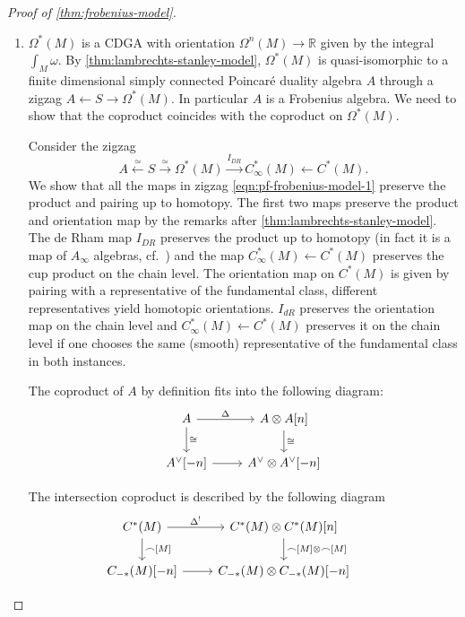 \documentclass{scrartcl}
\theoremstyle{plain}
\theoremstyle{definition}
\newcommand{\R}{\mathbb R}
\newcommand{\capp}{\mathbin{\frown}}
\newcommand{\iso}{\cong}
\newcommand{\quiso}{\simeq}
\newcommand{\from}{\leftarrow}
\let\xto\xrightarrow
\let\xfrom\xleftarrow
\begin{document}
\begin{proof}[Proof of \cref{thm:frobenius-model}]
    \begin{enumerate}
        \item 
    $\Omega^*(M)$ is a CDGA with orientation $\Omega^n(M)\to \R$ given by the integral $\int_M\omega$. By \cref{thm:lambrechts-stanley-model}, $\Omega^*(M)$ is quasi-isomorphic to a finite dimensional simply connected Poincaré duality algebra $A$ through a zigzag $A\from S\to \Omega^*(M)$. In particular $A$ is a Frobenius algebra. We need to show that the coproduct coincides with the coproduct on $\Omega^*(M)$. 


    Consider the zigzag 
    \begin{equation}A\xfrom{\quiso} S \xto{\quiso} \Omega^*(M)\xto{I_{DR}} C^*_\infty(M) \from C^*(M).\label{eqn:pf-frobenius-model-1}\end{equation} 
    We show that all the maps in zigzag \ref{eqn:pf-frobenius-model-1} preserve the product and pairing up to homotopy. The first two maps preserve the product and orientation map by the remarks after \cref{thm:lambrechts-stanley-model}. The de Rham map $I_{DR}$ preserves the product up to homotopy (in fact it is a map of $A_\infty$ algebras, cf.\ \cite{gugenheim1977chen}) and the map $C^*_\infty(M) \from C^*(M)$ preserves the cup product on the chain level. The orientation map on $C^*(M)$ is given by pairing with a representative of the fundamental class, different representatives yield homotopic orientations. $I_{dR}$ preserves the orientation map on the chain level and $C^*_\infty(M) \from C^*(M)$ preserves it on the chain level if one chooses the same (smooth) representative of the fundamental class in both instances. 

    The coproduct of $A$ by definition fits into the following diagram:
    \begin{equation}\label{diag:pf-frobenius-model-1}
        \begin{tikzcd}
            A \dar["\iso"]\rar["\Delta"] & A\otimes A[n] \dar["\iso"] \\
            A^\vee[-n] \rar & A^\vee\otimes A^\vee[-n]
        \end{tikzcd}
    \end{equation}

    The intersection coproduct is described by the following diagram
    \begin{equation}\label{diag:pf-frobenius-model-2}
    \begin{tikzcd}
    C^*(M) \dar["\capp {[M]}"] \rar["\Delta^!"] & C^{*}(M)\otimes C^*(M)[n] \dar["\capp{[M]}\otimes\capp{[M]}"] \\
    C_{-*}(M)[-n] \rar & C_{-*}(M)\otimes C_{-*}(M)[-n] &
    \end{tikzcd}
    \end{equation}


\end{enumerate}
\end{proof}
\end{document}
